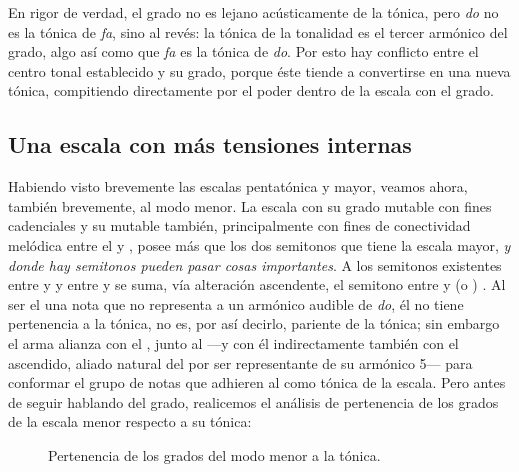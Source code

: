\documentclass[a4paper,12pt]{article}
\begin{document}
\begin{multicols}{2}
    En rigor de verdad, el  grado no es lejano acústicamente de la tónica, pero \emph{do} no es la tónica de \emph{fa}, sino al revés: la tónica de la tonalidad es el tercer armónico del  grado, algo así como que \emph{fa} es la tónica de \emph{do}. Por esto hay conflicto entre el centro tonal establecido y su  grado, porque éste tiende a convertirse en una nueva tónica, compitiendo directamente por el poder dentro de la escala con el  grado.

    \subsection{Una escala con más tensiones internas}\label{subsec:esc-mas-tensiones}
    Habiendo visto brevemente las escalas pentatónica y mayor, veamos ahora, también brevemente, al modo menor. La escala  con su  grado mutable con fines cadenciales y su  mutable también, principalmente con fines de conectividad melódica entre el  y , posee más que los dos semitonos que tiene la escala mayor, \emph{y donde hay semitonos pueden pasar cosas importantes}. A los semitonos existentes entre  y  y entre  y  se suma, vía alteración ascendente, el semitono entre  y  (o ) \hbox{.} Al ser el  una nota que no representa a un armónico audible de \emph{do}, él no tiene pertenencia a la tónica, no es, por así decirlo, pariente de la tónica; sin embargo el  arma alianza con el , junto al  ---y con él indirectamente también con el  ascendido, aliado natural del  por ser representante de su armónico 5--- para conformar el grupo de notas que adhieren al  como tónica de la escala. Pero antes de seguir hablando del  grado, realicemos el análisis de pertenencia de los grados de la escala menor respecto a su tónica:
\end{multicols}

\begin{figure}[ht]
\centering
{}
\caption{Pertenencia de los grados del modo menor a la tónica.}\label{fig:pertenencia-menor}
\end{figure}
\end{document}
